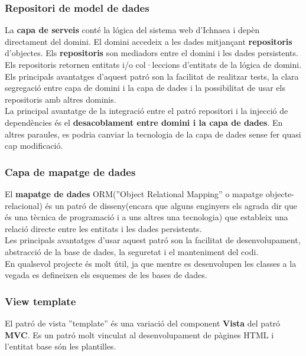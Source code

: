\subsubsection{Repositori de model de dades}
La \textbf{capa de serveis} cont\'{e} la l\'{o}gica del sistema web d'Ichnaea i depèn directament del domini. El domini accedeix a les dades mitjançant \textbf{repositoris} d'objectes. Els \textbf{repositoris} son mediadors entre el domini i les dades persistents. Els repositoris retornen entitats i/o col·leccions d'entitats de la l\'{ogica} de domini.\\

Els principals avantatges d'aquest patró son la facilitat de realitzar tests, la clara segregació entre capa de domini i la capa de dades i la possibilitat de usar els repositoris amb altres dominis.\\

La principal avantatge de la integració entre el patró repositori i la injecció de dependències \'{e}s el \textbf{desacoblament entre domini i la capa de dades}. En altres paraules, es podria canviar la tecnologia de la capa de dades sense fer quasi cap modificació. 

\label{ormdessign}
\subsubsection{Capa de mapatge de dades}
El \textbf{mapatge de dades} ORM(''Object Relational Mapping'' o mapatge objecte-relacional) \'{e}s un patr\'{o} de disseny(encara que alguns enginyers els agrada dir que \'{e}s una tècnica de programaci\'{o} i a uns altres una tecnologia) que estableix una relaci\'{o} directe entre les entitats i les dades persistents.\cite{orm}\\

Les principals avantatges d'usar aquest patró son la facilitat de desenvolupament, abstracció de la base de dades, la seguretat i el manteniment del codi.\\

En qualsevol projecte \'{e}s molt útil, ja que mentre es desenvolupen les classes a la vegada es defineixen els esquemes de les bases de dades.

\subsubsection{View template}
El patró de vista ''template'' \'{e}s una variació del component \textbf{Vista} del patró \textbf{MVC}. Es un patró molt vinculat al desenvolupament de p\`{a}gines HTML i l'entitat base s\'{o}n les plantilles.\\

